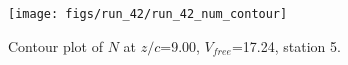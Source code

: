 \begin{figure}[H]
\centering
\texttt{[image: figs/run\_42/run\_42\_num\_contour]}
\caption{Contour plot of $N$ at $z/c$=9.00, $V_{free}$=17.24, station 5.}
\label{fig:run_42_num_contour}
\end{figure}


